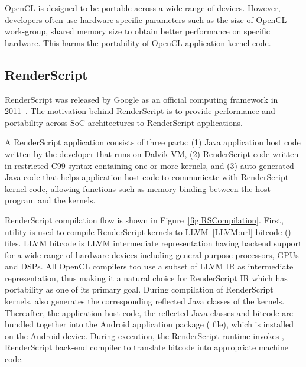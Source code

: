 OpenCL is designed to be portable across a wide range of devices. However,
developers often use hardware specific parameters such as the size of OpenCL
work-group, shared memory size to obtain better performance on specific
hardware. This harms the portability of OpenCL application kernel code.

\subsection{RenderScript}
RenderScript was released by Google as an official computing framework in
2011~\cite{RederScript:url}. The motivation behind RenderScript is to provide
performance and portability across SoC architectures to RenderScript
applications.

A RenderScript application consists of three parts: (1) Java application host
code written by the developer that runs on Dalvik VM, (2) RenderScript code
written in restricted C99 syntax containing one or more kernels, and (3)
auto-generated Java code that helps application host code to communicate with
RenderScript kernel code, allowing functions such as memory binding between the
host program and the kernels.

RenderScript compilation flow is shown in Figure~\ref{fig:RSCompilation}.
First,  utility is used to compile RenderScript kernels to
LLVM~\ref{LLVM:url} bitcode () files. LLVM bitcode is LLVM
intermediate representation having backend support for a wide range of hardware
devices including general purpose processors, GPUs and DSPs. All OpenCL
compilers too use a subset of LLVM IR as intermediate representation, thus
making it a natural choice for RenderScript IR which has portability as one of
its primary goal. During compilation of RenderScript kernels, 
also generates the corresponding reflected Java classes of the kernels.
Thereafter, the application host code, the reflected Java classes and bitcode
are bundled together into the Android application package ( file),
which is installed on the Android device. During execution, the RenderScript
runtime invokes , RenderScript back-end compiler to translate
bitcode into appropriate machine code.






